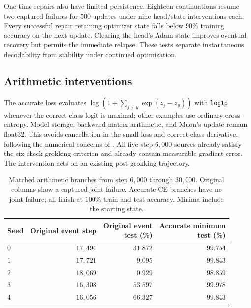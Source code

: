 One-time repairs also have limited persistence. Eighteen continuations resume two captured failures for $500$ updates under nine head/state interventions each. Every successful repair retaining optimizer state falls below $90\%$ training accuracy on the next update. Clearing the head's Adam state improves eventual recovery but permits the immediate relapse. These tests separate instantaneous decodability from stability under continued optimization.

\subsection{Arithmetic interventions}
\label{app:arithmetic}

The accurate loss evaluates $\log(1+\sum_{j\ne y}\exp(z_j-z_y))$ with \texttt{log1p} whenever the correct-class logit is maximal; other examples use ordinary cross-entropy. Model storage, backward matrix arithmetic, and Muon's update remain float32. This avoids cancellation in the small loss and correct-class derivative, following the numerical concerns of \citet{prieto2025grokking}. All five step-$6{,}000$ sources already satisfy the six-check grokking criterion and already contain measurable gradient error. The intervention acts on an existing post-grokking trajectory.

\begin{table}[htbp]
\centering
\small
\caption{Matched arithmetic branches from step $6{,}000$ through $30{,}000$. Original columns show a captured joint failure. Accurate-CE branches have no joint failure; all finish at $100\%$ train and test accuracy. Minima include the starting state.}
\label{tab:followup-arithmetic}
\begin{tabular}{lrrr}
\toprule
Seed & Original event step & \shortstack{Original event\\test (\%)} & \shortstack{Accurate minimum\\test (\%)} \\
\midrule
$0$ & $17{,}494$ & $31.872$ & $99.754$ \\
$1$ & $17{,}721$ & $9.095$ & $99.843$ \\
$2$ & $18{,}069$ & $0.929$ & $98.859$ \\
$3$ & $16{,}308$ & $53.597$ & $99.978$ \\
$4$ & $16{,}056$ & $66.327$ & $99.843$ \\
\bottomrule
\end{tabular}
\end{table}

